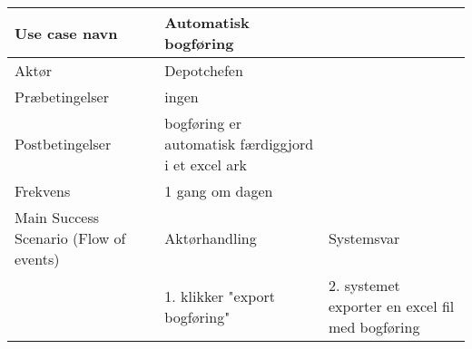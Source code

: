 \begin{longtable}{ |p{120pt}|p{120pt}|p{120pt}| }
    \hline
    Use case navn & Automatisk bogføring & \\
    \hline
    Aktør & Depotchefen & \\
    \hline
    Præbetingelser & ingen & \\
    \hline
    Postbetingelser & bogføring er automatisk færdiggjord i et excel ark & \\
    \hline
    Frekvens & 1 gang om dagen & \\
    \hline
    Main Success Scenario (Flow of events) & Aktørhandling & Systemsvar \\
    \hline
    & 1. klikker "export bogføring" & 2. systemet exporter en excel fil med bogføring \\
    \hline
\end{longtable}